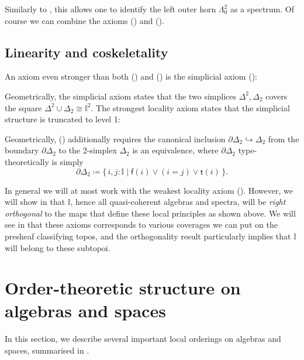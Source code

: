 \documentclass[a4paper,12pt]{amsart}
\theoremstyle{definition}
\newcommand{\mbb}[1]{\mathbb{#1}}
\newcommand{\I}{\mbb I}
\newcommand{\ms}[1]{\mathsf{#1}}
\newcommand{\scomp}[2]{\{\,#1\mid#2\,\}}
\newcommand{\hook}{\hookrightarrow}
\newcommand\istsym{\ms{t}}
\newcommand\isfsym{\ms{f}}
\newcommand\ist[1]{\istsym(#1)}
\newcommand\isf[1]{\isfsym(#1)}
\begin{document}
\PrintAxiomCL

Similarly to , this allows one to identify the left outer horn $\Lambda^2_0$ as a spectrum. Of course we can combine the axioms (\AxiomL) and (\AxiomCL). 

\subsection{Linearity and coskeletality}\label{sec:linearity-and-coskeletality}

An axiom even stronger than both (\AxiomL) and (\AxiomCL) is the simplicial axiom (\AxiomSL):

\PrintAxiomSL

Geometrically, the simplicial axiom states that the two simplices $\Delta^2,\Delta_2$ covers the square $\Delta^2 \cup \Delta_2 \cong \I^2$.
The strongest locality axiom states that the simplicial structure is truncated to level 1:


\PrintAxiomOneCS

Geometrically, (\AxiomOneCS) additionally requires the canonical inclusion $\partial\Delta_2 \hook \Delta_2$ from the boundary $\partial\Delta_2$ to the 2-simplex $\Delta_2$ is an equivalence, where $\partial\Delta_2$ type-theoretically is simply
\[ \partial\Delta_2 \coloneq \scomp{i,j : \I}{\isf{i} \vee (i = j) \vee \ist{i}}\text{.} \]

In general we will at most work with the weakest locality axiom (\AxiomNT). However, we will show in  that $\I$, hence all quasi-coherent algebras and spectra, will be \emph{right orthogonal} to the maps that define these local principles as shown above. We will see in  that these axioms corresponds to various coverages we can put on the presheaf classifying topos, and the orthogonality result particularly implies that $\I$ will belong to these subtopoi.


\section{Order-theoretic structure on algebras and spaces}\label{sec:order-theoretic-structure}

In this section, we describe several important local orderings on algebras and spaces, summarised in .
\end{document}

